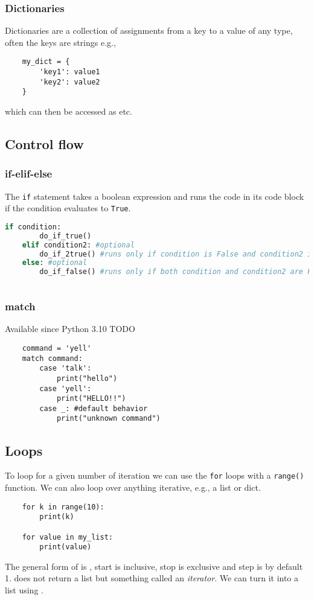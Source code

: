 \subsubsection{Dictionaries}
Dictionaries are a collection of assignments from a key to a value of any type, often the keys are strings e.g.,
\begin{lstlisting}
    my_dict = {
        'key1': value1
        'key2': value2
    }
\end{lstlisting}
which can then be accessed as  etc.


\subsection{Control flow}

\subsubsection{if-elif-else}
The \verb|if| statement takes a boolean expression and runs the code in its code block if the condition evaluates to \verb|True|.
\begin{lstlisting}[language=Python]
    if condition:
        do_if_true()
    elif condition2: #optional
        do_if_2true() #runs only if condition is False and condition2 is True
    else: #optional
        do_if_false() #runs only if both condition and condition2 are False
        
\end{lstlisting}

\subsubsection{match}
Available since Python 3.10
TODO
\begin{lstlisting}
    command = 'yell'
    match command:
        case 'talk':
            print("hello")
        case 'yell':
            print("HELLO!!")
        case _: #default behavior
            print("unknown command")
\end{lstlisting}

\subsection{Loops}
To loop for a given number of iteration we can use the \verb|for| loops with a \verb|range()| function. We can also loop over anything iterative, e.g., a list or dict.
\begin{lstlisting}
    for k in range(10):
        print(k)

    for value in my_list:
        print(value) 
\end{lstlisting}
The general form of  is , start is inclusive, stop is exclusive and step is by default 1.  does not return a list but something called an \emph{iterator}. We can turn it into a list using .

